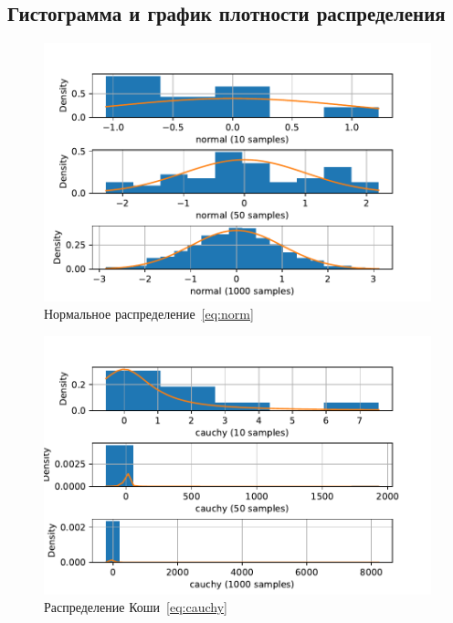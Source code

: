 \documentclass[a4paper]{article}
\begin{document}
	\subsection{Гистограмма и график плотности распределения}
	\begin{figure}[H]
            \centering
            \includegraphics[width = 16 cm]{src_lab_1/normal}
            \caption{Нормальное распределение~\eqref{eq:norm}}
            \label{fig:norm}
        \end{figure}

        \begin{figure}[H]
            \centering
            \includegraphics[width = 16 cm]{src_lab_1/cauchy}
            \caption{Распределение Коши~\eqref{eq:cauchy}}
            \label{fig:cauchy}
        \end{figure}
\end{document}

